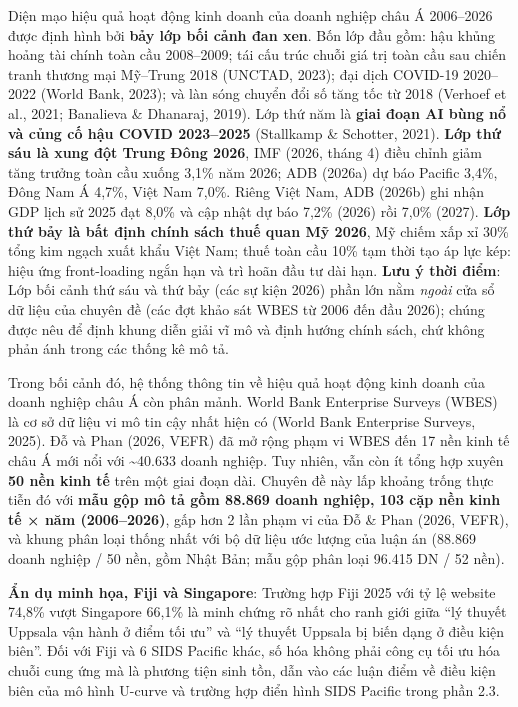 \documentclass[
  a4paper,
  13pt]{extreport}
\begin{document}
Diện mạo hiệu quả hoạt động kinh doanh của doanh nghiệp châu Á
2006--2026 được định hình bởi \textbf{bảy lớp bối cảnh đan xen}. Bốn lớp
đầu gồm: hậu khủng hoảng tài chính toàn cầu 2008--2009; tái cấu trúc
chuỗi giá trị toàn cầu sau chiến tranh thương mại Mỹ--Trung 2018
(UNCTAD, 2023); đại dịch COVID-19 2020--2022 (World Bank, 2023); và làn
sóng chuyển đổi số tăng tốc từ 2018 (Verhoef et al., 2021; Banalieva \&
Dhanaraj, 2019). Lớp thứ năm là \textbf{giai đoạn AI bùng nổ và củng cố
hậu COVID 2023--2025} (Stallkamp \& Schotter, 2021). \textbf{Lớp thứ sáu
là xung đột Trung Đông 2026}, IMF (2026, tháng 4) điều chỉnh giảm tăng
trưởng toàn cầu xuống 3,1\% năm 2026; ADB (2026a) dự báo Pacific 3,4\%,
Đông Nam Á 4,7\%, Việt Nam 7,0\%. Riêng Việt Nam, ADB (2026b) ghi nhận
GDP lịch sử 2025 đạt 8,0\% và cập nhật dự báo 7,2\% (2026) rồi 7,0\%
(2027). \textbf{Lớp thứ bảy là bất định chính sách thuế quan Mỹ 2026},
Mỹ chiếm xấp xỉ 30\% tổng kim ngạch xuất khẩu Việt Nam; thuế toàn cầu
10\% tạm thời tạo áp lực kép: hiệu ứng front-loading ngắn hạn và trì
hoãn đầu tư dài hạn. \textbf{Lưu ý thời điểm}: Lớp bối cảnh thứ sáu và
thứ bảy (các sự kiện 2026) phần lớn nằm \emph{ngoài} cửa sổ dữ liệu của
chuyên đề (các đợt khảo sát WBES từ 2006 đến đầu 2026); chúng được nêu
để định khung diễn giải vĩ mô và định hướng chính sách, chứ không phản
ánh trong các thống kê mô tả.

Trong bối cảnh đó, hệ thống thông tin về hiệu quả hoạt động kinh doanh
của doanh nghiệp châu Á còn phân mảnh. World Bank Enterprise Surveys
(WBES) là cơ sở dữ liệu vi mô tin cậy nhất hiện có (World Bank
Enterprise Surveys, 2025). Đỗ và Phan (2026, VEFR) đã mở rộng phạm vi
WBES đến 17 nền kinh tế châu Á mới nổi với \textasciitilde40.633 doanh
nghiệp. Tuy nhiên, vẫn còn ít tổng hợp xuyên \textbf{50 nền kinh tế}
trên một giai đoạn dài. Chuyên đề này lấp khoảng trống thực tiễn đó với
\textbf{mẫu gộp mô tả gồm 88.869 doanh nghiệp, 103 cặp nền kinh tế × năm
(2006--2026)}, gấp hơn 2 lần phạm vi của Đỗ \& Phan (2026, VEFR), và
khung phân loại thống nhất với bộ dữ liệu ước lượng của luận án (88.869
doanh nghiệp / 50 nền, gồm Nhật Bản; mẫu gộp phân loại 96.415 DN / 52
nền).

\textbf{Ẩn dụ minh họa, Fiji và Singapore}: Trường hợp Fiji 2025 với tỷ
lệ website 74,8\% vượt Singapore 66,1\% là minh chứng rõ nhất cho ranh
giới giữa ``lý thuyết Uppsala vận hành ở điểm tối ưu'' và ``lý thuyết
Uppsala bị biến dạng ở điều kiện biên''. Đối với Fiji và 6 SIDS Pacific
khác, số hóa không phải công cụ tối ưu hóa chuỗi cung ứng mà là phương
tiện sinh tồn, dẫn vào các luận điểm về điều kiện biên của mô hình
U-curve và trường hợp điển hình SIDS Pacific trong phần 2.3.
\end{document}
